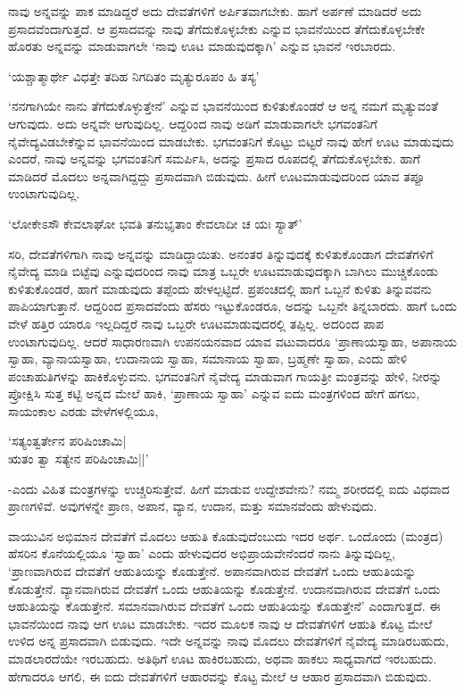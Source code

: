 ನಾವು ಅನ್ನವನ್ನು ಪಾಕ ಮಾಡಿದ್ದರೆ ಅದು ದೇವತೆಗಳಿಗೆ ಅರ್ಪಿತವಾಗಬೇಕು. ಹಾಗೆ ಅರ್ಪಣೆ ಮಾಡಿದರೆ ಅದು ಪ್ರಸಾದವೆಂದಾಗುತ್ತದೆ. ಆ ಪ್ರಸಾದವನ್ನು ನಾವು ತೆಗೆದುಕೊಳ್ಳಬೇಕು ಎನ್ನುವ ಭಾವನೆಯಿಂದ ತೆಗೆದುಕೊಳ್ಳಬೇಕೇ ಹೊರತು ಅನ್ನವನ್ನು ಮಾಡುವಾಗಲೇ `ನಾವು ಊಟ ಮಾಡುವುದಕ್ಕಾಗಿ' ಎನ್ನುವ ಭಾವನೆ ಇರಬಾರದು.

\begin{shloka}
`ಯಶ್ಚಾತ್ಮಾರ್ಥೇ ವಿಧತ್ತೇ ತದಿಹ ನಿಗದಿತಂ ಮೃತ್ಯುರೂಪಂ ಹಿ ತಸ್ಯ'
\end{shloka}

`ನನಗಾಗಿಯೇ ನಾನು ತೆಗೆದುಕೊಳ್ಳುತ್ತೇನೆ' ಎನ್ನುವ ಭಾವನೆಯಿಂದ ಕುಳಿತುಕೊಂಡರೆ ಆ ಅನ್ನ ನಮಗೆ ಮೃತ್ಯುವಂತೆ ಆಗುವುದು. ಅದು ಅನ್ನವೇ ಆಗುವುದಿಲ್ಲ. ಆದ್ದರಿಂದ ನಾವು ಅಡಿಗೆ ಮಾಡುವಾಗಲೇ ಭಗವಂತನಿಗೆ ನೈವೇದ್ಯವಿಡಬೇಕೆನ್ನುವ ಭಾವನೆಯಿಂದ ಮಾಡಬೇಕು. ಭಗವಂತನಿಗೆ ಕೊಟ್ಟು ಬಿಟ್ಟರೆ ನಾವು ಹೇಗೆ ಊಟ ಮಾಡುವುದು ಎಂದರೆ, ನಾವು ಅನ್ನವನ್ನು ಭಗವಂತನಿಗೆ ಸಮರ್ಪಿಸಿ, ಅದನ್ನು  ಪ್ರಸಾದ ರೂಪದಲ್ಲಿ ತೆಗೆದುಕೊಳ್ಳಬೇಕು. ಹಾಗೆ ಮಾಡಿದರೆ ಮೊದಲು ಅನ್ನವಾಗಿದ್ದದ್ದು  ಪ್ರಸಾದವಾಗಿ ಬಿಡುವುದು. ಹೀಗೆ ಊಟಮಾಡುವುದರಿಂದ ಯಾವ ತಪ್ಪೂ ಉಂಟಾಗುವುದಿಲ್ಲ.

\begin{shloka}
`ಲೋಕೇಽಸೌ ಕೇವಲಾಘೋ ಭವತಿ ತನುಭೃತಾಂ ಕೇವಲಾದೀ ಚ ಯಃ ಸ್ಯಾತ್'
\end{shloka}

ಸರಿ, ದೇವತೆಗಳಿಗಾಗಿ ನಾವು ಅನ್ನವನ್ನು ಮಾಡಿದ್ದಾಯಿತು. ಅನಂತರ ತಿನ್ನುವುದಕ್ಕೆ ಕುಳಿತುಕೊಂಡಾಗ ದೇವತೆಗಳಿಗೆ ನೈವೇದ್ಯ ಮಾಡಿ ಬಿಟ್ಟೆವು ಎನ್ನುವುದರಿಂದ ನಾವು ಮಾತ್ರ ಒಬ್ಬರೇ ಊಟಮಾಡುವುದಕ್ಕಾಗಿ ಬಾಗಿಲು ಮುಚ್ಚಿಕೊಂಡು ಕುಳಿತುಕೊಂಡರೆ, ಹಾಗೆ ಮಾಡುವುದು ತಪ್ಪೆಂದು ಹೇಳಲ್ಪಟ್ಟಿದೆ. ಪ್ರಪಂಚದಲ್ಲಿ ಹಾಗೆ ಒಬ್ಬನೆ ಕುಳಿತು ತಿನ್ನುವವನು ಪಾಪಿಯಾಗುತ್ತಾನೆ. ಆದ್ದರಿಂದ ಪ್ರಸಾದವೆಂದು ಹೆಸರು ಇಟ್ಟುಕೊಂಡರೂ, ಅದನ್ನು ಒಬ್ಬನೇ ತಿನ್ನಬಾರದು. ಹಾಗೆ ಒಂದು ವೇಳೆ ಹತ್ತಿರ ಯಾರೂ ಇಲ್ಲದಿದ್ದರೆ ನಾವು ಒಬ್ಬರೇ ಊಟಮಾಡುವುದರಲ್ಲಿ ತಪ್ಪಿಲ್ಲ. ಅದರಿಂದ ಪಾಪ ಉಂಟಾಗುವುದಿಲ್ಲ. ಆದರೆ ಸಾಧಾರಣವಾಗಿ ಉಪನಯನವಾದ ಯಾವ ವಟುವಾದರೂ `ಪ್ರಾಣಾಯಸ್ವಾಹಾ, ಅಪಾನಾಯ ಸ್ವಾಹಾ, ವ್ಯಾನಾಯಸ್ವಾಹಾ, ಉದಾನಾಯ ಸ್ವಾಹಾ, ಸಮಾನಾಯ ಸ್ವಾಹಾ, ಬ್ರಹ್ಮಣೇ ಸ್ವಾಹಾ, ಎಂದು ಹೇಳಿ ಪಂಚಾಹುತಿಗಳನ್ನು ಹಾಕಿಕೊಳ್ಳುವನು. ಭಗವಂತನಿಗೆ ನೈವೇದ್ಯ ಮಾಡುವಾಗ ಗಾಯತ್ರೀ ಮಂತ್ರವನ್ನು ಹೇಳಿ, ನೀರನ್ನು ಪ್ರೋಕ್ಷಿಸಿ ಸುತ್ತ ಕಟ್ಟಿ ಅನ್ನದ ಮೇಲೆ ಹಾಕಿ, `ಪ್ರಾಣಾಯ ಸ್ವಾಹಾ' ಎನ್ನುವ ಐದು ಮಂತ್ರಗಳಿಂದ ಹೇಗೆ ಹಗಲು, ಸಾಯಂಕಾಲ ಎರಡು ವೇಳೆಗಳಲ್ಲಿಯೂ,

\begin{shloka}
`ಸತ್ಯಂತ್ವರ್ತೇನ ಪರಿಷಿಂಚಾಮಿ|\\
ಋತಂ ತ್ವಾ ಸತ್ಯೇನ ಪರಿಷಿಂಚಾಮಿ||'
\end{shloka}

-ಎಂದು ವಿಹಿತ ಮಂತ್ರಗಳನ್ನು ಉಚ್ಚರಿಸುತ್ತೇವೆ. ಹೀಗೆ ಮಾಡುವ ಉದ್ದೇಶವೇನು? ನಮ್ಮ ಶರೀರದಲ್ಲಿ ಐದು ವಿಧವಾದ ಪ್ರಾಣಗಳಿವೆ. ಅವುಗಳನ್ನೇ ಪ್ರಾಣ, ಅಪಾನ, ವ್ಯಾನ, ಉದಾನ, ಮತ್ತು ಸಮಾನವೆಂದು ಹೇಳುವುದು.

ವಾಯುವಿನ ಅಭಿಮಾನ ದೇವತೆಗೆ ಮೊದಲು ಆಹುತಿ ಕೊಡುವುದೆಂಬುದು ಇದರ ಅರ್ಥ. ಒಂದೊಂದು (ಮಂತ್ರದ) ಹೆಸರಿನ ಕೊನೆಯಲ್ಲಿಯೂ `ಸ್ವಾಹಾ' ಎಂದು ಹೇಳುವುದರ ಅಭಿಪ್ರಾಯವೇನೆಂದರೆ ನಾನು ತಿನ್ನುವುದಿಲ್ಲ, `ಪ್ರಾಣವಾಗಿರುವ ದೇವತೆಗೆ ಆಹುತಿಯನ್ನು ಕೊಡುತ್ತೇನೆ. ಅಪಾನವಾಗಿರುವ ದೇವತೆಗೆ ಒಂದು ಆಹುತಿಯನ್ನು ಕೊಡುತ್ತೇನೆ. ವ್ಯಾನವಾಗಿರುವ ದೇವತೆಗೆ ಒಂದು ಆಹುತಿಯನ್ನು ಕೊಡುತ್ತೇನೆ. ಉದಾನವಾಗಿರುವ ದೇವತೆಗೆ ಒಂದು ಆಹುತಿಯನ್ನು ಕೊಡುತ್ತೇನೆ. ಸಮಾನವಾಗಿರುವ ದೇವತೆಗೆ ಒಂದು ಆಹುತಿಯನ್ನು ಕೊಡುತ್ತೇನೆ' ಎಂದಾಗುತ್ತದೆ. ಈ ಭಾವನೆಯಿಂದ ನಾವು ಆಗ ಊಟ ಮಾಡಬೇಕು. ಇದರ ಮೂಲಕ ನಾವು ಆ ದೇವತೆಗಳಿಗೆ ಆಹುತಿ ಕೊಟ್ಟ ಮೇಲೆ ಉಳಿದ ಅನ್ನ ಪ್ರಸಾದವಾಗಿ ಬಿಡುವುದು. ಇದೇ ಅನ್ನವನ್ನು ನಾವು ಮೊದಲು ದೇವತೆಗಳಿಗೆ ನೈವೇದ್ಯ ಮಾಡಿರಬಹುದು, ಮಾಡಲಾರದೆಯೇ ಇರಬಹುದು. ಅತಿಥಿಗೆ ಊಟ ಹಾಕಿರಬಹುದು, ಅಥವಾ ಹಾಕಲು ಸಾಧ್ಯವಾಗದೆ ಇರಬಹುದು. ಹೇಗಾದರೂ ಆಗಲಿ, ಈ ಐದು ದೇವತೆಗಳಿಗೆ ಆಹಾರವನ್ನು ಕೊಟ್ಟ ಮೇಲೆ ಆ ಆಹಾರ ಪ್ರಸಾದವಾಗಿ ಬಿಡುವುದು.

